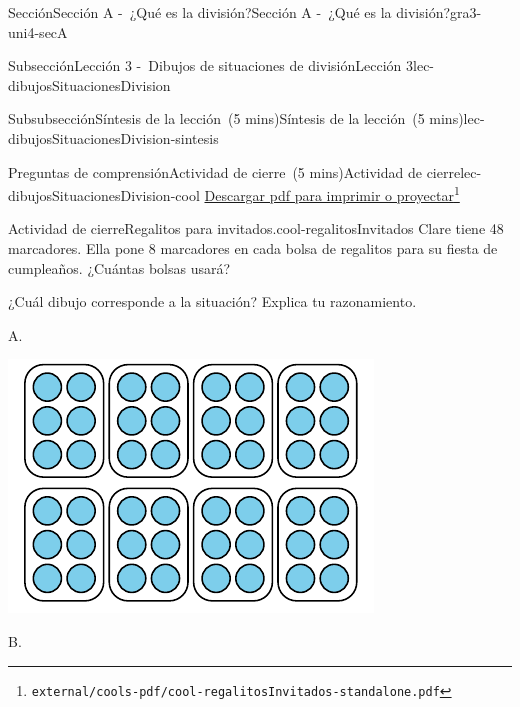 \documentclass[oneside,10pt,]{article}
\begin{document}
\begin{sectionptx}{Sección}{Sección A -~¿Qué es la división?}{}{Sección A -~¿Qué es la división?}{}{}{gra3-uni4-secA}
\begin{subsectionptx}{Subsección}{Lección 3 -~Dibujos de situaciones de división}{}{Lección 3}{}{}{lec-dibujosSituacionesDivision}
\begin{subsubsectionptx}{Subsubsección}{Síntesis de la lección~(5 mins)}{}{Síntesis de la lección~(5 mins)}{}{}{lec-dibujosSituacionesDivision-sintesis}
\end{subsubsectionptx}
%
%
\typeout{************************************************}
\typeout{************************************************}
%
\begin{reading-questions-subsubsection}{Preguntas de comprensión}{Actividad de cierre~(5 mins)}{}{Actividad de cierre}{}{}{lec-dibujosSituacionesDivision-cool}
\href{external/cools-pdf/cool-regalitosInvitados-standalone.pdf}{Descargar pdf para imprimir o proyectar}\footnote{\nolinkurl{external/cools-pdf/cool-regalitosInvitados-standalone.pdf}\label{lec-dibujosSituacionesDivision-cool-5}}\begin{project}{Actividad de cierre}{Regalitos para invitados.}{cool-regalitosInvitados}%
Clare tiene 48 marcadores. Ella pone 8 marcadores en cada bolsa de regalitos para su fiesta de cumpleaños. ¿Cuántas bolsas usará?%
\par
¿Cuál dibujo corresponde a la situación? Explica tu razonamiento.%
\begin{sidebyside}{2}{0}{0}{0}%
\begin{sbspanel}{0.5}%
A.%
\par
\includegraphics[width=\linewidth]{external/svg-source/tikz-file-246306.pdf}
\end{sbspanel}%
\begin{sbspanel}{0.5}%
B.%
\par

\end{sbspanel}
\end{sidebyside}
\end{project}
\end{reading-questions-subsubsection}
\end{subsectionptx}
\end{sectionptx}
\end{document}
